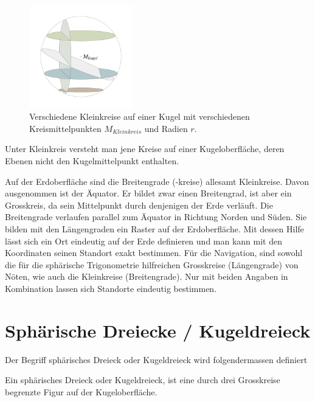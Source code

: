 \begin{refsection}
\begin{figure}[hbtp]
\centering
\includegraphics[width=0.4\textwidth]{kugel/Kleinkreise.jpg}
\caption{Verschiedene Kleinkreise auf einer Kugel mit verschiedenen
Kreismittelpunkten $M_{Kleinkreis}$ und Radien $r$.}
\end{figure}

\begin{definition}
Unter Kleinkreis versteht man jene Kreise auf einer Kugeloberfläche,
deren Ebenen nicht den Kugelmittelpunkt enthalten.
\label{skript:kugel:satz:Kleinkreis}
%
\end{definition} 

Auf der Erdoberfläche sind die Breitengrade (-kreise) allesamt
Kleinkreise. Davon ausgenommen ist der Äquator. Er bildet zwar einen
Breitengrad, ist aber ein Grosskreis, da sein Mittelpunkt durch
denjenigen der Erde verläuft.
Die Breitengrade verlaufen parallel zum Äquator in Richtung Norden
und Süden. Sie bilden mit den Längengraden ein Raster auf der
Erdoberfläche. Mit dessen Hilfe lässt sich ein Ort eindeutig auf
der Erde definieren und man kann mit den Koordinaten seinen Standort
exakt bestimmen.
Für die Navigation, sind sowohl die für die sphärische Trigonometrie
hilfreichen Grosskreise (Längengrade) von Nöten, wie auch die
Kleinkreise (Breitengrade). Nur mit beiden Angaben in Kombination
lassen sich Standorte eindeutig bestimmen.



\section{Sphärische Dreiecke / Kugeldreieck}
%
%
Der Begriff sphärisches Dreieck oder Kugeldreieck wird folgendermassen
definiert

\begin{definition}
Ein sphärisches Dreieck oder Kugeldreieck, ist eine durch drei
Grosskreise begrenzte Figur auf der Kugeloberfläche.
\end{definition} 


\end{refsection}
